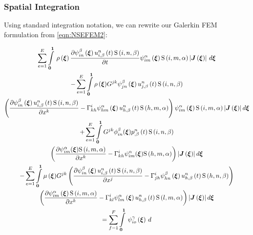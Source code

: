 \subsubsection{Spatial Integration}

Using standard integration notation, we can rewrite our Galerkin FEM formulation from \ref{eqn:NSEFEM2}:


\begin{multline}
 \label{NSEFEM3}
  \dsum_{e=1}^{E}\gint{\vect{0}}{\vect{1}}{\fnof{\rho}{\vect{\xi}}\delby{\idxgbfn{i}{n}{\beta}{\vect{\xi}}
      \fnof{\idxnodedof{u}{i}{n}{\beta}}{t}\idxgsf{i}{n}{\beta}}{t}
    \idxgbfn{i}{m}{\alpha}{\vect{\xi}}\idxgsf{i}{m}{\alpha}
    \abs{\fnof{\matr{J}}{\vect{\xi}}}}{\vect{\xi}}\\
  - \dsum_{e=1}^{E}\dintl{\vect{0}}{\vect{1}}{\fnof{\rho}{\vect{\xi}}}G^{jk}\idxgbfn{j}{n}{\beta}{\vect{\xi}}
  \fnof{\idxnodedof{u}{j}{n}{\beta}}{t}\idxgsf{i}{n}{\beta}\\
  \pbrac{\delby{\idxgbfn{i}{n}{\beta}{\vect{\xi}}\fnof{\idxnodedof{u}{i}{n}{\beta}}{t}
      \idxgsf{i}{n}{\beta}}{x^{k}}-\christoffel{i}{k}{h}\idxgbfn{h}{m}{\alpha}{\vect{\xi}}
    \fnof{\idxnodedof{u}{h}{n}{\beta}}{t}\idxgsf{h}{m}{\alpha}}
  \idxgbfn{i}{m}{\alpha}{\vect{\xi}}\idxgsf{i}{m}{\alpha}
  \abs{\fnof{\matr{J}}{\vect{\xi}}}d\vect{\xi}\\
  +\dsum_{e=1}^{E}\dintl{\vect{0}}{\vect{1}}G^{jk}\phi_{in}^{\beta}({\vect{\xi}})
  \fnof{\idxnodedof{p}{}{n}{\beta}}{t}\idxgsf{i}{n}{\beta}\\
  \pbrac{\delby{\psi_{im}^{\alpha}({\vect{\xi}})\idxgsf{i}{m}{\alpha}}{x^{k}}-
  \christoffel{i}{k}{h}\psi_{im}^{\alpha}({\vect{\xi}})\idxgsf{h}{m}{\alpha}
    }\abs{\fnof{\matr{J}}{\vect{\xi}}}d\vect{\xi}\\
  -\dsum_{e=1}^{E}\dintl{\vect{0}}{\vect{1}}{\fnof{\mu}{\vect{\xi}}}G^{jk}\pbrac{\delby{\idxgbfn{i}{n}{\beta}{\vect{\xi}}
     \fnof{\idxnodedof{u}{i}{n}{\beta}}{t}\idxgsf{i}{n}{\beta}}{x^{j}}-
      \christoffel{i}{j}{h}\idxgbfn{h}{n}{\beta}{\vect{\xi}}
      \fnof{\idxnodedof{u}{h}{n}{\beta}}{t}\idxgsf{h}{n}{\beta}} \\
    \pbrac{\delby{\idxgbfn{i}{m}{\alpha}{\vect{\xi}}\idxgsf{i}{m}{\alpha}}{x^{k}}-
      \christoffel{i}{k}{l}\idxgbfn{l}{m}{\alpha}{\vect{\xi}}
      \fnof{\idxnodedof{u}{h}{n}{\beta}}{t}
      \idxgsf{l}{m}{\alpha}}\abs{\fnof{\matr{J}}{\vect{\xi}}}d\vect{\xi}\\
  =\dsum_{f=1}^{F}\gint{\vect{0}}{\vect{1}}{\idxgbfn{i}{o}{\gamma}{\vect{\xi}}
}
\end{multline}
